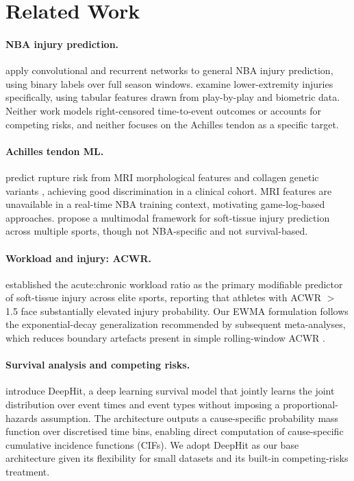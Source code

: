 \documentclass{article}
\begin{document}
\section{Related Work}
\label{sec:related}

\paragraph{NBA injury prediction.}
\citet{cohan2021} apply convolutional and recurrent networks to general NBA
injury prediction, using binary labels over full season windows.
\citet{lu2022} examine lower-extremity injuries specifically, using tabular
features drawn from play-by-play and biometric data.  Neither work models
right-censored time-to-event outcomes or accounts for competing risks, and
neither focuses on the Achilles tendon as a specific target.

\paragraph{Achilles tendon ML.}
\citet{kapinski2024} predict rupture risk from MRI morphological features and
collagen genetic variants \citep{september2012}, achieving good discrimination
in a clinical cohort.  MRI features are unavailable in a real-time NBA training
context, motivating game-log-based approaches.  \citet{li2025} propose a
multimodal framework for soft-tissue injury prediction across multiple sports,
though not NBA-specific and not survival-based.

\paragraph{Workload and injury: ACWR.}
\citet{gabbett2016} established the acute:chronic workload ratio as the primary
modifiable predictor of soft-tissue injury across elite sports, reporting that
athletes with ACWR $>$ 1.5 face substantially elevated injury probability.  Our
EWMA formulation follows the exponential-decay generalization recommended by
subsequent meta-analyses, which reduces boundary artefacts present in simple
rolling-window ACWR \citep{torresronda2022}.

\paragraph{Survival analysis and competing risks.}
\citet{lee2018deephit} introduce DeepHit, a deep learning survival model that
jointly learns the joint distribution over event times and event types without
imposing a proportional-hazards assumption.  The architecture outputs a
cause-specific probability mass function over discretised time bins, enabling
direct computation of cause-specific cumulative incidence functions (CIFs).
We adopt DeepHit as our base architecture given its flexibility for small
datasets and its built-in competing-risks treatment.
\end{document}

